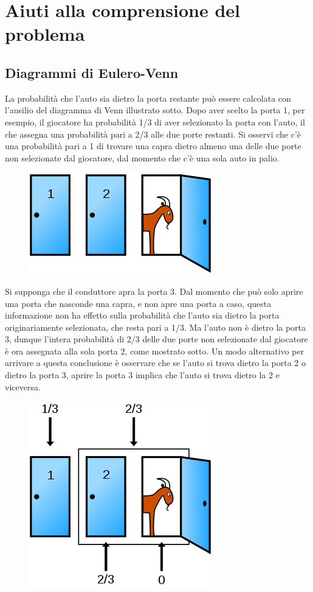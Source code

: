 \documentclass[a4paper, 12pt]{report}
\begin{document}
\chapter{Aiuti alla comprensione del problema}
\section{Diagrammi di Eulero-Venn}
La probabilità che l'auto sia dietro la porta restante può essere calcolata con l'ausilio del diagramma di Venn illustrato sotto. Dopo aver scelto la porta 1, per esempio, il giocatore ha probabilità 1/3 di aver selezionato la porta con l'auto, il che assegna una probabilità pari a 2/3 alle due porte restanti. Si osservi che c'è una probabilità pari a 1 di trovare una capra dietro almeno una delle due porte non selezionate dal giocatore, dal momento che c'è una sola auto in palio.

\begin{figure}[htbp]
	\centering
	\includegraphics[scale=0.5]{monty1}
\end{figure}

Si supponga che il conduttore apra la porta 3. Dal momento che può solo aprire una porta che nasconde una capra, e non apre una porta a caso, questa informazione non ha effetto sulla probabilità che l'auto sia dietro la porta originariamente selezionata, che resta pari a 1/3. Ma l'auto non è dietro la porta 3, dunque l'intera probabilità di 2/3 delle due porte non selezionate dal giocatore è ora assegnata alla sola porta 2, come mostrato sotto. Un modo alternativo per arrivare a questa conclusione è osservare che se l'auto si trova dietro la porta 2 o dietro la porta 3, aprire la porta 3 implica che l'auto si trova dietro la 2 e viceversa.

\begin{figure}[htbp]
	\centering
	\includegraphics[scale=0.5]{monty2}
\end{figure}
\end{document}
